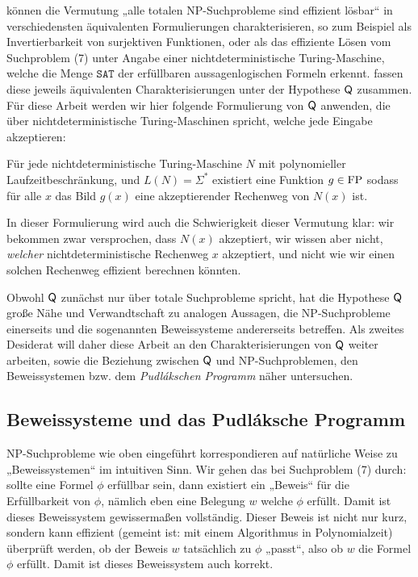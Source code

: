 \printallnames%
\textcite{fenner_inverting_2003} können die Vermutung „alle totalen NP-Suchprobleme sind effizient lösbar“ in verschiedensten äquivalenten Formulierungen charakterisieren, so zum Beispiel als Invertierbarkeit von surjektiven Funktionen, oder als das effiziente Lösen vom Suchproblem (7) unter Angabe einer nichtdeterministische Turing-Maschine, welche die Menge $\mathtt{SAT}$ der erfüllbaren aussagenlogischen Formeln erkennt.
\citeauthor{fenner_inverting_2003} fassen diese jeweils äquivalenten Charakterisierungen unter der Hypothese $\mathsf{Q}$ zusammen. Für diese Arbeit werden wir hier folgende Formulierung von  $\mathsf{Q}$ anwenden, die über nichtdeterministische Turing-Maschinen spricht, welche jede Eingabe akzeptieren:
\begin{conjecture}\label{conj:q}
    Für jede nichtdeterministische Turing-Maschine $N$ mit polynomieller Laufzeitbeschränkung, und $L(N)=\Sigma^*$ existiert eine Funktion $g\in\mathrm{FP}$ sodass für alle $x$ das Bild $g(x)$ eine akzeptierender Rechenweg von $N(x)$ ist. 
\end{conjecture}
In dieser Formulierung wird auch die Schwierigkeit dieser Vermutung klar: wir bekommen zwar versprochen, dass $N(x)$ akzeptiert, wir wissen aber nicht, \emph{welcher} nichtdeterministische Rechenweg $x$ akzeptiert, und nicht wie wir einen solchen Rechenweg effizient berechnen könnten.

Obwohl $\mathsf{Q}$ zunächst nur über totale Suchprobleme spricht, hat die Hypothese 
 $\mathsf{Q}$ große Nähe und Verwandtschaft zu analogen Aussagen, die NP-Suchprobleme einerseits und die sogenannten Beweissysteme andererseits betreffen.
Als zweites Desiderat will daher diese Arbeit an den Charakterisierungen von $\mathsf{Q}$ weiter arbeiten, sowie die Beziehung zwischen $\mathsf{Q}$ und NP-Suchproblemen, den Beweissystemen \parencite[nach][]{cook_relative_1979} bzw. dem \emph{Pudlákschen Programm} \parencite*{pudlak_incompleteness_2017} näher untersuchen.


\subsection*{Beweissysteme und das Pudláksche Programm}

NP-Suchprobleme wie oben eingeführt korrespondieren auf natürliche Weise zu „Beweissystemen“ im intuitiven Sinn. Wir gehen das bei Suchproblem (7) durch: sollte eine Formel $\phi$ erfüllbar sein, dann existiert ein „Beweis“ für die Erfüllbarkeit von $\phi$, nämlich eben eine Belegung $w$ welche $\phi$ erfüllt. Damit ist dieses Beweissystem gewissermaßen vollständig.
Dieser Beweis ist nicht nur kurz, sondern kann effizient (gemeint ist: mit einem Algorithmus in Polynomialzeit) überprüft werden, ob der Beweis $w$ tatsächlich zu $\phi$ „passt“, also ob $w$ die Formel $\phi$ erfüllt. Damit ist dieses Beweissystem auch korrekt.

